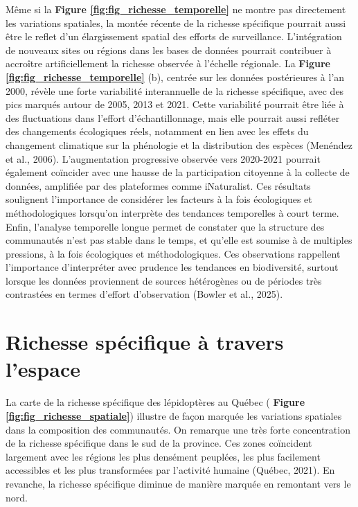 \documentclass[9pt,twocolumn,twoside,]{pnas-new}
\begin{document}
Même si la \textbf{Figure \ref{fig:fig_richesse_temporelle}} ne montre
pas directement les variations spatiales, la montée récente de la
richesse spécifique pourrait aussi être le reflet d'un élargissement
spatial des efforts de surveillance. L'intégration de nouveaux sites ou
régions dans les bases de données pourrait contribuer à accroître
artificiellement la richesse observée à l'échelle régionale. La
\textbf{Figure \ref{fig:fig_richesse_temporelle}} (b), centrée sur les
données postérieures à l'an 2000, révèle une forte variabilité
interannuelle de la richesse spécifique, avec des pics marqués autour de
2005, 2013 et 2021. Cette variabilité pourrait être liée à des
fluctuations dans l'effort d'échantillonnage, mais elle pourrait aussi
refléter des changements écologiques réels, notamment en lien avec les
effets du changement climatique sur la phénologie et la distribution des
espèces (Menéndez et al., 2006). L'augmentation progressive observée
vers 2020-2021 pourrait également coïncider avec une hausse de la
participation citoyenne à la collecte de données, amplifiée par des
plateformes comme iNaturalist. Ces résultats soulignent l'importance de
considérer les facteurs à la fois écologiques et méthodologiques
lorsqu'on interprète des tendances temporelles à court terme. Enfin,
l'analyse temporelle longue permet de constater que la structure des
communautés n'est pas stable dans le temps, et qu'elle est soumise à de
multiples pressions, à la fois écologiques et méthodologiques. Ces
observations rappellent l'importance d'interpréter avec prudence les
tendances en biodiversité, surtout lorsque les données proviennent de
sources hétérogènes ou de périodes très contrastées en termes d'effort
d'observation (Bowler et al., 2025).

\section*{Richesse spécifique à travers
l'espace}\label{richesse-spuxe9cifique-uxe0-travers-lespace}

La carte de la richesse spécifique des lépidoptères au Québec (
\textbf{Figure \ref{fig:fig_richesse_spatiale}}) illustre de façon
marquée les variations spatiales dans la composition des communautés. On
remarque une très forte concentration de la richesse spécifique dans le
sud de la province. Ces zones coïncident largement avec les régions les
plus densément peuplées, les plus facilement accessibles et les plus
transformées par l'activité humaine (Québec, 2021). En revanche, la
richesse spécifique diminue de manière marquée en remontant vers le
nord.
\end{document}
